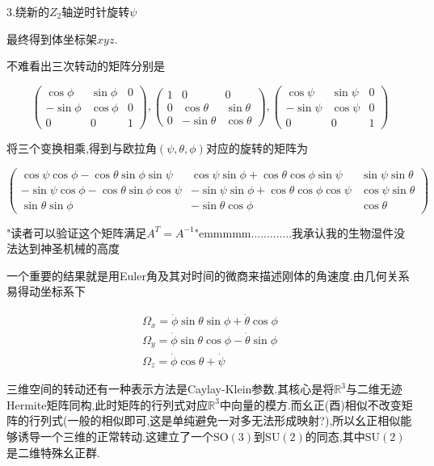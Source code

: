 \documentclass[UTF8]{article}
\begin{document}
	3.绕新的$Z_2$轴逆时针旋转$\psi$
	
	最终得到体坐标架$xyz$.
	
	不难看出三次转动的矩阵分别是
	
	\[
	\begin{pmatrix}
		\cos\phi&\sin\phi&0\\
		-\sin\phi&\cos\phi&0\\
		0&0&1
	\end{pmatrix}
	,
	\begin{pmatrix}
		1&0&0\\
		0&\cos\theta&\sin\theta\\
		0&-\sin\theta&\cos\theta
	\end{pmatrix}
	,
	\begin{pmatrix}
		\cos\psi&\sin\psi&0\\
		-\sin\psi&\cos\psi&0\\
		0&0&1
	\end{pmatrix}
	\]
	
	将三个变换相乘,得到与欧拉角$(\psi,\theta,\phi)$对应的旋转的矩阵为
	
	\[
	\begin{pmatrix}
		\cos \psi \cos \phi-\cos \theta \sin \phi \sin \psi & \cos \psi \sin \phi+\cos \theta \cos \phi \sin \psi & \sin \psi \sin \theta \\
		-\sin \psi \cos \phi-\cos \theta \sin \phi \cos \psi & -\sin \psi \sin \phi+\cos \theta \cos \phi \cos \psi & \cos \psi \sin \theta \\
		\sin \theta \sin \phi & -\sin \theta \cos \phi & \cos \theta
	\end{pmatrix}
	\]
	
	"读者可以验证这个矩阵满足$A^T=A^{-1}$"emmmmm.............我承认我的生物湿件没法达到神圣机械的高度
	
	一个重要的结果就是用Euler角及其对时间的微商来描述刚体的角速度.由几何关系易得动坐标系下
	
	\[
	\begin{matrix}
		\Omega_x=\dot{\phi}\sin\theta\sin\phi+\dot{\theta}\cos\phi\\
		\Omega_y=\dot{\phi}\sin\theta\cos\phi-\dot{\theta}\sin\phi\\
		\Omega_z=\dot{\phi}\cos\theta+\dot{\psi}
	\end{matrix}
	\]
	
	三维空间的转动还有一种表示方法是Caylay-Klein参数.其核心是将$\mathbb{R}^3$与二维无迹Hermite矩阵同构,此时矩阵的行列式对应$\mathbb{R}^3$中向量的模方.而幺正(酉)相似不改变矩阵的行列式(一般的相似即可,这是单纯避免一对多无法形成映射?),所以幺正相似能够诱导一个三维的正常转动.这建立了一个$\mathrm{SO(3)}$到$\mathrm{SU(2)}$的同态,其中$\mathrm{SU(2)}$是二维特殊幺正群.
	
\end{document}
